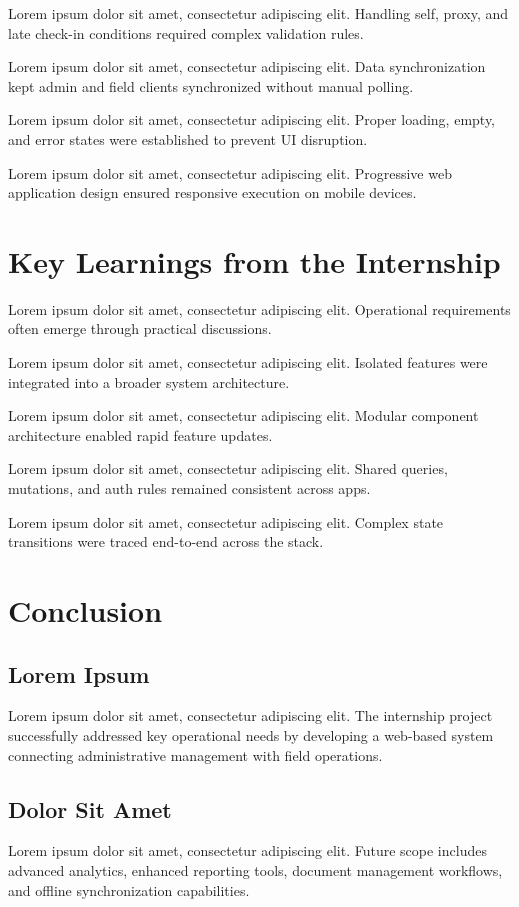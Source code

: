 \documentclass[12pt,a4paper,oneside]{report}
\begin{document}
Lorem ipsum dolor sit amet, consectetur adipiscing elit. Handling self, proxy, and late check-in conditions required complex validation rules.

Lorem ipsum dolor sit amet, consectetur adipiscing elit. Data synchronization kept admin and field clients synchronized without manual polling.

Lorem ipsum dolor sit amet, consectetur adipiscing elit. Proper loading, empty, and error states were established to prevent UI disruption.

Lorem ipsum dolor sit amet, consectetur adipiscing elit. Progressive web application design ensured responsive execution on mobile devices.

\chapter{Key Learnings from the Internship}
Lorem ipsum dolor sit amet, consectetur adipiscing elit. Operational requirements often emerge through practical discussions.

Lorem ipsum dolor sit amet, consectetur adipiscing elit. Isolated features were integrated into a broader system architecture.

Lorem ipsum dolor sit amet, consectetur adipiscing elit. Modular component architecture enabled rapid feature updates.

Lorem ipsum dolor sit amet, consectetur adipiscing elit. Shared queries, mutations, and auth rules remained consistent across apps.

Lorem ipsum dolor sit amet, consectetur adipiscing elit. Complex state transitions were traced end-to-end across the stack.

\chapter{Conclusion}

\section{Lorem Ipsum}
Lorem ipsum dolor sit amet, consectetur adipiscing elit. The internship project successfully addressed key operational needs by developing a web-based system connecting administrative management with field operations.

\section{Dolor Sit Amet}
Lorem ipsum dolor sit amet, consectetur adipiscing elit. Future scope includes advanced analytics, enhanced reporting tools, document management workflows, and offline synchronization capabilities.
\end{document}

